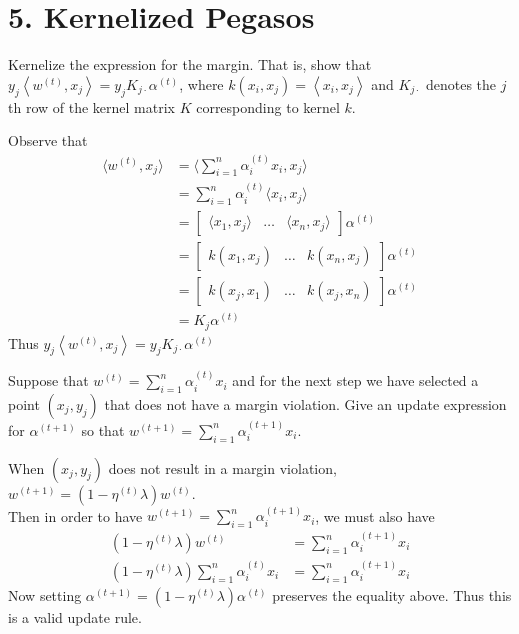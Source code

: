 \documentclass[12pt,letterpaper]{article}
\begin{document}
\section{5. Kernelized Pegasos}
\begin{problem}{}
Kernelize the expression for the margin. That is, show that $y_{j}\left\langle w^{(t)},x_{j}\right\rangle =y_{j}K_{j\cdot}\alpha^{(t)}$,
where $k(x_{i},x_{j})=\left\langle x_{i},x_{j}\right\rangle $ and
$K_{j\cdot}$ denotes the $j$th row of the kernel matrix $K$ corresponding
to kernel $k$.
\end{problem}
\begin{solution}{}
    Observe that
    \begin{align*}
        \langle w^{(t)}, x_j \rangle &= \langle \sum_{i=1}^n \alpha_i^{(t)}x_i, x_j \rangle\\
        &= \sum_{i=1}^n \alpha_i^{(t)} \langle x_i, x_j \rangle\\
        &= \begin{bmatrix} \langle x_1, x_j \rangle & \dots & \langle x_n,x_j \rangle \end{bmatrix} \alpha^{(t)}\\
        &= \begin{bmatrix} k(x_1,x_j)  & \dots & k(x_n,x_j) \end{bmatrix} \alpha^{(t)}\\
        &= \begin{bmatrix} k(x_j,x_1)  & \dots & k(x_j,x_n) \end{bmatrix} \alpha^{(t)}\\
        &= K_j\alpha^{(t)}
    \end{align*}
    Thus $y_{j}\left\langle w^{(t)},x_{j}\right\rangle =y_{j}K_{j\cdot}\alpha^{(t)}$
\end{solution}
\newpage

\begin{problem}{5.2}
Suppose that $w^{(t)}=\sum_{i=1}^{n}\alpha_{i}^{(t)}x_{i}$ and for
the next step we have selected a point $\left(x_{j},y_{j}\right)$
that does not have a margin violation. Give an update expression for
$\alpha^{(t+1)}$ so that $w^{(t+1)}=\sum_{i=1}^{n}\alpha_{i}^{(t+1)}x_{i}$.
\end{problem}
\begin{solution}{}
    When $\left(x_{j},y_{j}\right)$ does not result in a margin violation, $w^{(t+1)} = (1-\eta^{(t)}\lambda)w^{(t)}$.\\ 
    Then in order to have $w^{(t+1)}=\sum_{i=1}^{n}\alpha_{i}^{(t+1)}x_{i}$, we must also have 
    \begin{align*}
        (1-\eta^{(t)}\lambda)w^{(t)} &= \sum_{i=1}^{n}\alpha_{i}^{(t+1)}x_{i}\\
        (1-\eta^{(t)}\lambda)\sum_{i=1}^{n}\alpha_{i}^{(t)}x_{i} &= \sum_{i=1}^{n}\alpha_{i}^{(t+1)}x_{i}
    \end{align*}
    Now setting $\alpha^{(t+1)} = (1-\eta^{(t)}\lambda)\alpha^{(t)}$ preserves the equality above. Thus this is a valid update rule.
\end{solution}
\newpage
\end{document}
